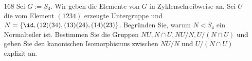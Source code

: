 \begin{algebraUE}{168}
Sei $G := S_4$. Wir geben die Elemente von $G$ in Zyklenschreibweise an. Sei
$U$ die vom Element $(1234)$ erzeugte Untergruppe und $N = \{\id, (12)(34),(13)(24),(14)(23)\}$.
Begründen Sie, warum $N \vartriangleleft S_4$ ein Normalteiler ist. Bestimmen
Sie die Gruppen $NU, N\cap U, NU/N, U/(N \cap U)$ und geben Sie den kanonischen
Isomorphismus zwischen $NU/N$ und $U/(N \cap U)$ explizit an.
\end{algebraUE}
\begin{solution}
\leavevmode \\
\end{solution}
